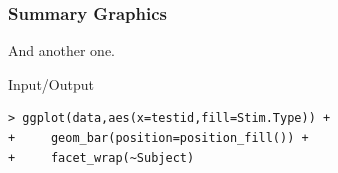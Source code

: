 \documentclass[xcolor={table},c]{beamer}
\begin{document}
\begin{frame}[fragile]\frametitle{Summary Graphics}
And another one.
\begin{exampleblock}{Input/Output}\tiny
\begin{verbatim}
> ggplot(data,aes(x=testid,fill=Stim.Type)) +
+     geom_bar(position=position_fill()) +
+     facet_wrap(~Subject)
\end{verbatim}
    \end{exampleblock}
\begin{center}
\end{center}
\end{frame}


\appendix
\flushlinkimages
\end{document}
